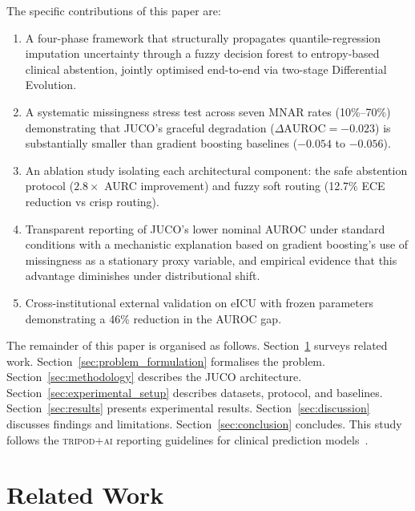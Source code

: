 \documentclass[a4paper,fleqn,longmktitle]{cas-sc}
\begin{document}
	The specific contributions of this paper are:
	\begin{enumerate}
		\item A four-phase framework that structurally propagates
		quantile-regression imputation uncertainty through a fuzzy
		decision forest to entropy-based clinical abstention,
		jointly optimised end-to-end via two-stage Differential
		Evolution.
		
		\item A systematic missingness stress test across seven MNAR rates
		(10\%--70\%) demonstrating that JUCO's graceful degradation
		($\Delta\text{AUROC} = {-}0.023$) is substantially smaller
		than gradient boosting baselines ($-0.054$ to $-0.056$).
		
		\item An ablation study isolating each architectural component:
		the safe abstention protocol ($2.8{\times}$ AURC improvement) and
		fuzzy soft routing (12.7\% ECE reduction vs crisp routing).
		
		\item Transparent reporting of JUCO's lower nominal AUROC under
		standard conditions with a mechanistic explanation based on
		gradient boosting's use of missingness as a stationary
		proxy variable, and empirical evidence that this advantage
		diminishes under distributional shift.
		
		\item Cross-institutional external validation on eICU with frozen
		parameters demonstrating a 46\% reduction in the AUROC gap.
	\end{enumerate}
	
	The remainder of this paper is organised as follows.
	Section~\ref{sec:related_work} surveys related work.
	Section~\ref{sec:problem_formulation} formalises the problem.
	Section~\ref{sec:methodology} describes the JUCO architecture.
	Section~\ref{sec:experimental_setup} describes datasets, protocol,
	and baselines.
	Section~\ref{sec:results} presents experimental results.
	Section~\ref{sec:discussion} discusses findings and limitations.
	Section~\ref{sec:conclusion} concludes.
	This study follows the \textsc{tripod+ai} reporting
	guidelines for clinical prediction models~\citep{collins2024tripodai}.
	
	\section{Related Work}
	\label{sec:related_work}
	
\end{document}
